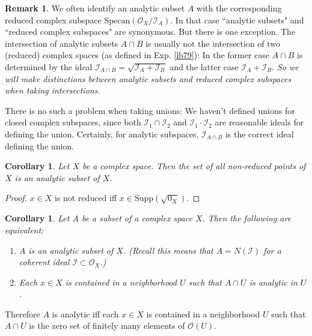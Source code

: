 \documentclass[12pt,b5paper,notitlepage]{report}
\theoremstyle{definition}
\newtheorem{rem}[df]{Remark}
\theoremstyle{plain}
\newtheorem{co}[df]{Corollary}
\newcommand{\mc}{\mathcal}
\newcommand{\scr}{\mathscr}
\newcommand{\Supp}{\mathrm{Supp}}
\newcommand{\Specan}{\mathrm{Specan}}
\numberwithin{equation}{section}
\begin{document}
\begin{rem}\label{lb127}
We often identify an analytic subset $A$ with the corresponding reduced complex subspace $\Specan(\scr O_X/\scr I_A)$.  In that case ``analytic subsets" and ``reduced complex subspaces" are synonymous. But there is one exception. The intersection of analytic subsets $A\cap B$ is usually not the intersection of two (reduced) complex spaces (as defined in Exp. \ref{lb79}): In the former case $A\cap B$ is determined by the ideal $\scr I_{A\cap B}=\sqrt{\scr I_A+\scr I_B}$ and the latter case $\scr I_A+\scr I_B$. {\color{red}\emph{So we will make distinctions between analytic subsets and reduced complex subspaces when taking intersections.}} 

There is no such a problem when taking unions: We haven't defined unions for closed complex subspaces, since both $\mc I_1\cap \mc I_2$ and $\mc I_1\cdot\mc I_2$ are reasonable ideals for defining the union. Certainly, for analytic subspaces, $\scr I_{A\cap B}$ is the correct ideal defining the union.   \hfill\qedsymbol
\end{rem}



\begin{co}\label{lb135}
Let $X$ be a complex space. Then the set of all non-reduced points of $X$ is an analytic subset of $X$.
\end{co}


\begin{proof}
$x\in X$ is not reduced iff $x\in\Supp(\sqrt{0_X})$.
\end{proof}



\begin{co}\label{lb136}
Let $A$ be a subset of a complex space $X$. Then the following are equivalent:
\begin{enumerate}[label=(\arabic*)]
\item $A$ is an analytic subset of $X$. (Recall this means that $A=N(\mc I)$ for a coherent ideal $\mc I\subset\scr O_X$.)
\item Each $x\in X$ is contained in a neighborhood $U$ such that $A\cap U$ is analytic in $U$.
\end{enumerate}
\end{co}


Therefore $A$ is analytic iff each $x\in X$ is contained in a neighborhood $U$ such that $A\cap U$ is the zero set of finitely many elements of $\scr O(U)$.
\end{document}
